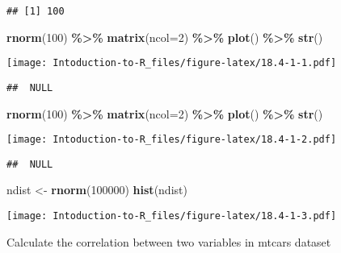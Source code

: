 \documentclass[
]{article}
\newenvironment{Shaded}{\begin{snugshade}}{\end{snugshade}}
\newcommand{\AttributeTok}[1]{\textcolor[rgb]{0.13,0.29,0.53}{#1}}
\newcommand{\DecValTok}[1]{\textcolor[rgb]{0.00,0.00,0.81}{#1}}
\newcommand{\FunctionTok}[1]{\textcolor[rgb]{0.13,0.29,0.53}{\textbf{#1}}}
\newcommand{\NormalTok}[1]{#1}
\newcommand{\OtherTok}[1]{\textcolor[rgb]{0.56,0.35,0.01}{#1}}
\newcommand{\SpecialCharTok}[1]{\textcolor[rgb]{0.81,0.36,0.00}{\textbf{#1}}}
\begin{document}
\begin{verbatim}
## [1] 100
\end{verbatim}

\begin{Shaded}
\begin{Highlighting}[]
\FunctionTok{rnorm}\NormalTok{(}\DecValTok{100}\NormalTok{) }\SpecialCharTok{\%\textgreater{}\%} 
  \FunctionTok{matrix}\NormalTok{(}\AttributeTok{ncol=}\DecValTok{2}\NormalTok{) }\SpecialCharTok{\%\textgreater{}\%} 
  \FunctionTok{plot}\NormalTok{() }\SpecialCharTok{\%\textgreater{}\%} 
  \FunctionTok{str}\NormalTok{()}
\end{Highlighting}
\end{Shaded}

\texttt{[image: Intoduction-to-R\_files/figure-latex/18.4-1-1.pdf]}

\begin{verbatim}
##  NULL
\end{verbatim}

\begin{Shaded}
\begin{Highlighting}[]
\FunctionTok{rnorm}\NormalTok{(}\DecValTok{100}\NormalTok{) }\SpecialCharTok{\%\textgreater{}\%} 
  \FunctionTok{matrix}\NormalTok{(}\AttributeTok{ncol=}\DecValTok{2}\NormalTok{) }\SpecialCharTok{\%\textgreater{}\%} 
  \FunctionTok{plot}\NormalTok{() }\SpecialCharTok{\%\textgreater{}\%} 
  \FunctionTok{str}\NormalTok{()}
\end{Highlighting}
\end{Shaded}

\texttt{[image: Intoduction-to-R\_files/figure-latex/18.4-1-2.pdf]}

\begin{verbatim}
##  NULL
\end{verbatim}

\begin{Shaded}
\begin{Highlighting}[]
\NormalTok{ndist }\OtherTok{\textless{}{-}} \FunctionTok{rnorm}\NormalTok{(}\DecValTok{100000}\NormalTok{)}
\FunctionTok{hist}\NormalTok{(ndist)}
\end{Highlighting}
\end{Shaded}

\texttt{[image: Intoduction-to-R\_files/figure-latex/18.4-1-3.pdf]}

Calculate the correlation between two variables in mtcars dataset

\begin{Shaded}
\end{Shaded}
\end{document}
